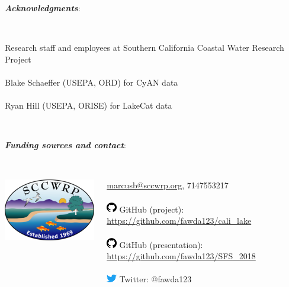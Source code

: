 \documentclass[serif]{beamer}\usepackage[]{graphicx}\usepackage[]{color}
\newcommand{\emtxt}[1]{\textbf{\textit{{\color{mypal4} #1}}}}
\begin{document}
\begin{frame}
\emtxt{Acknowledgments}:\\~\\
\begin{columns}
\begin{column}{0.8\textwidth}
{\footnotesize
Research staff and employees at Southern California Coastal Water Research Project\\~\\
Blake Schaeffer (USEPA, ORD) for CyAN data\\~\\
Ryan Hill (USEPA, ORISE) for LakeCat data\\~\\}
\end{column}
\begin{column}{0.2\textwidth}
\end{column}
\end{columns}
\vfill
\emtxt{Funding sources and contact}:\\~\\
\begin{columns}
\begin{column}{0.5\textwidth}
\vfill
\centerline{\includegraphics[width=0.6\linewidth]{fig/sccwrp_logo.png}}
\vfill
\end{column}
\begin{column}{0.5\textwidth}
\scriptsize
\href{mailto:marcusb@sccwrp.org}{marcusb@sccwrp.org}, 7147553217\\~\\
\includegraphics[width = 0.05\textwidth]{fig/git.png} GitHub (project): \href{https://github.com/fawda123/cali_lake}{https://github.com/fawda123/cali\_lake}\\~\\
\includegraphics[width = 0.05\textwidth]{fig/git.png} GitHub (presentation): \href{https://github.com/fawda123/SFS_2018}{https://github.com/fawda123/SFS\_2018}\\~\\
\includegraphics[width = 0.05\textwidth]{fig/twitter.png} Twitter: @fawda123
\end{column}
\end{columns}
\vspace{0.2in}
\end{frame}
\end{document}
